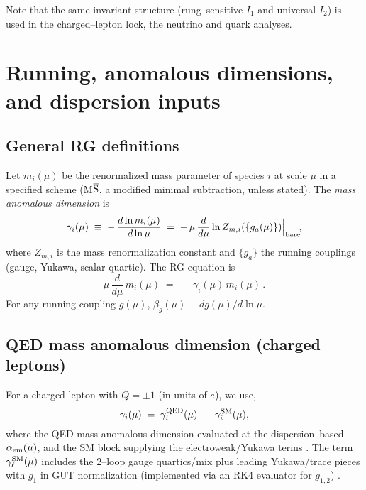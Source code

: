 \documentclass[%
  amsmath,amssymb,
  aps,
 prb,
 floatfix, showkeys
 ]{revtex4-2}
\begin{document}
  Note that  the same invariant structure
  (rung--sensitive $I_1$ and universal $I_2$) is used in  the charged--lepton lock,
  the neutrino and quark analyses.
 
 \section{Running, anomalous dimensions, and dispersion inputs}
 \label{sec:running}
 
 \subsection{General RG definitions}    
 \label{subsec:rg_defs}
 Let $m_i(\mu)$ be the renormalized mass parameter of species $i$ at
 scale $\mu$ in a specified scheme (M$\overline{\rm S}$, a modified minimal subtraction, unless stated).
 The \emph{mass anomalous dimension} is
 \begin{equation}
   \gamma_i(\mu) \;\equiv\; -\,\frac{d\ln m_i(\mu)}{d\ln\mu}
   \;=\; -\,\mu\,\frac{d}{d\mu}\ln Z_{m,i}(\{g_a(\mu)\})\Big|_{\rm bare}\!,
   \label{eq:gamma_def}
 \end{equation}
 where $Z_{m,i}$ is the mass renormalization constant and $\{g_a\}$ the running couplings (gauge, Yukawa, scalar quartic). The RG equation is
 \begin{equation}
   \mu\,\frac{d}{d\mu}\,m_i(\mu) \;=\; -\,\gamma_i(\mu)\,m_i(\mu)\,.
   \label{eq:RGE_mass}
 \end{equation}
 For any running coupling $g(\mu)$, $\beta_g(\mu)\equiv d g(\mu)/d\ln\mu$.
 
 \subsection{QED mass anomalous dimension (charged leptons)}  
 \label{subsec:qed_ad}
 For a charged lepton with $Q=\pm 1$ (in units of $e$), we use, 
 \begin{equation}
   \gamma_i(\mu)\;=\;\gamma^{\rm QED}_i(\mu)\;+\;\gamma^{\rm SM}_i(\mu),
 \end{equation}
 where the QED mass anomalous dimension evaluated at the dispersion--based $\alpha_{\rm em}(\mu)$,
 and the SM block supplying the electroweak/Yukawa terms  \cite{Tarrach1981}.
 The term $\gamma^{\rm SM}_\ell(\mu)$ includes the 2--loop gauge quartics/mix plus leading
 Yukawa/trace pieces with $g_1$ in GUT normalization (implemented via an RK4 evaluator
 for $g_{1,2}$) \cite{MachacekVaughn1983-85,Buttazzo2013}.
   
\end{document}
